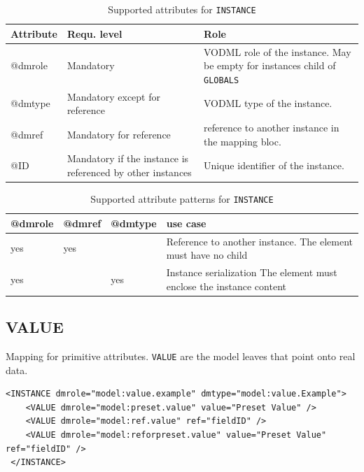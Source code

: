 \documentclass[11pt,a4paper]{ivoa}
\begin{document}
\begin{table}[ht!]
     \begin{tabular}{|p{1.5cm}|p{4cm}|p{7cm}|}
       \hline Attribute & Requ. level & Role\\
       \hline  @dmrole   & Mandatory & VODML role of the instance. May be empty for instances child of 
                                      \texttt{GLOBALS}  \\
       \hline  @dmtype  & Mandatory except for reference & VODML type of the instance.   \\
       \hline  @dmref  & Mandatory for reference & reference to another instance in the mapping bloc. \\          
       \hline  @ID  & Mandatory if the instance is referenced by other instances & Unique identifier of the instance. \\
       \hline 
     \end{tabular}
     \caption{Supported attributes for  \texttt{INSTANCE}} 
 \end{table}

\begin{table}[ht!]
\begin{tabular}{|p{1.5cm}|p{1.5cm}|p{1.5cm}|p{5cm}|}
\hline @dmrole & @dmref &  @dmtype &  use case\\
\hline  yes & yes &  & Reference to another instance. The element must have no child  \\
\hline  yes &  & yes  & Instance serialization The element must enclose the instance content  \\
\hline 
\end{tabular}
     \caption{Supported attribute patterns for  \texttt{INSTANCE}} 
 \end{table}

\subsection{VALUE}

Mapping for primitive attributes. \texttt{VALUE}  are the model leaves that point onto real data. 


\begin{lstlisting}[caption={VALUE examples},captionpos=b]
<INSTANCE dmrole="model:value.example" dmtype="model:value.Example">
    <VALUE dmrole="model:preset.value" value="Preset Value" />    
    <VALUE dmrole="model:ref.value" ref="fieldID" />    
    <VALUE dmrole="model:reforpreset.value" value="Preset Value" ref="fieldID" />
 </INSTANCE>
\end{lstlisting}
\end{document}
